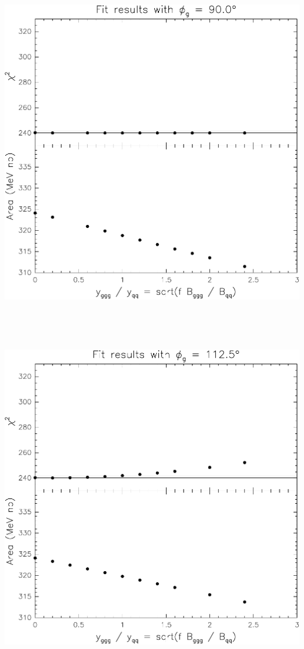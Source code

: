 \documentclass[12pt]{article}
\begin{document}
\vfill

\mbox{ }

\pagebreak

\mbox{ }

\vfill

\includegraphics[width=\linewidth]{interference-e}

\vfill

\mbox{ }

\pagebreak

\mbox{ }

\vfill

\includegraphics[width=\linewidth]{interference-f}
\end{document}
